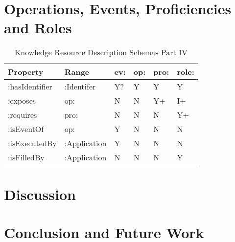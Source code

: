 \documentclass[runningheads]{llncs}
\begin{document}
\section{Operations, Events, Proficiencies and Roles}

\begin{table}[h]
\centering
\begin{tabular}{|l|l|l|l|l|l|}
 \hline
\textbf{Property} & \textbf{Range} & \textbf{ev:} & \textbf{op:}  & \textbf{pro:} & \textbf{role:} \\ \hline
:hasIdentifier    & :Identifer     & Y?           & Y             & Y             & Y              \\ \hline
:exposes          & op:            & N            & N             & Y+            & I+              \\ \hline
:requires         & pro:           & N            & N             & N             & Y+              \\ \hline
:isEventOf        & op:            & Y            & N             & N             & N              \\ \hline
:isExecutedBy     & :Application   & Y            & N             & N             & N              \\ \hline
:isFilledBy       & :Application   & N            & N             & N             & Y              \\ \hline
\end{tabular}
\caption{Knowledge Resource Description Schemas Part IV}
\label{krqschemas}
\end{table}

\section{Discussion}

\section{Conclusion and Future Work}
\label{conc}

%
%


\end{document}

